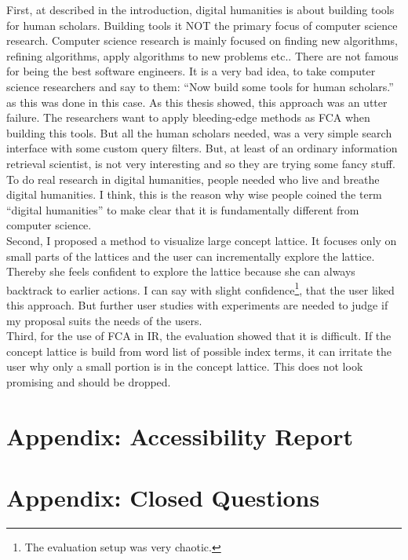 \documentclass[11pt]{report}
\begin{document}
First, at described in the introduction, digital humanities is about building tools for human scholars. Building tools it NOT the primary focus of computer science research. Computer science research is mainly focused on finding new algorithms, refining algorithms, apply algorithms to new problems etc.. There are not famous for being the best software engineers. It is a very bad idea, to take computer science researchers and say to them: ``Now build some tools for human scholars.'' as this was done in this case. As this thesis showed, this approach was an utter failure. The researchers want to apply bleeding-edge methods as FCA when building this tools. But all the human scholars needed, was a very simple search interface with some custom query filters. But, at least of an ordinary information retrieval scientist, is not very interesting and so they are trying some fancy stuff. To do real research in digital humanities, people needed who live and breathe digital humanities. I think, this is the reason why wise people coined the term ``digital humanities'' to make clear that it is fundamentally different from computer science. \\

Second, I proposed a method to visualize large concept lattice. It focuses only on small parts of the lattices and the user can incrementally explore the lattice. Thereby she feels confident to explore the lattice because she can always backtrack to earlier actions. I can say with slight confidence\footnote{The evaluation setup was very chaotic.}, that the user liked this approach. But further user studies with experiments are needed to judge if my proposal suits the needs of the users. \\

Third, for the use of FCA in IR, the evaluation showed that it is difficult. If the concept lattice is build from word list of possible index terms, it can irritate the user why only a small portion is in the concept lattice. This does not look promising and should be dropped.
\newpage



\newpage
\appendix
\chapter{Appendix: Accessibility Report}
\label{app:access}



\chapter{Appendix: Closed Questions}
\label{app:closed}
\end{document}
